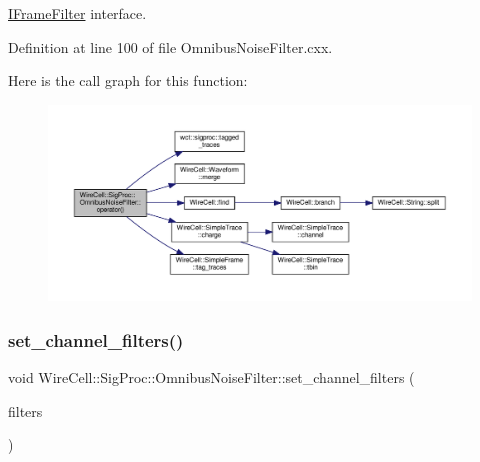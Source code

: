 \hyperlink{class_wire_cell_1_1_i_frame_filter}{I\+Frame\+Filter} interface. 



Definition at line 100 of file Omnibus\+Noise\+Filter.\+cxx.

Here is the call graph for this function\+:
\nopagebreak
\begin{figure}[H]
\begin{center}
\leavevmode
\includegraphics[width=350pt]{class_wire_cell_1_1_sig_proc_1_1_omnibus_noise_filter_a861a76be3558adf47d2f7da5b00357f1_cgraph}
\end{center}
\end{figure}
\mbox{\label{class_wire_cell_1_1_sig_proc_1_1_omnibus_noise_filter_ae85bd8dd4a3582fa2122008a67f8edec}} 
\subsubsection{\texorpdfstring{set\+\_\+channel\+\_\+filters()}{set\_channel\_filters()}}
{\footnotesize\ttfamily void Wire\+Cell\+::\+Sig\+Proc\+::\+Omnibus\+Noise\+Filter\+::set\+\_\+channel\+\_\+filters (\begin{DoxyParamCaption}\item[{std\+::vector$<$ \hyperlink{class_wire_cell_1_1_i_component_a744b962ee9489c909f1b0f1fe2533798}{Wire\+Cell\+::\+I\+Channel\+Filter\+::pointer} $>$}]{filters }\end{DoxyParamCaption})\hspace{0.3cm}{\ttfamily [inline]}}



